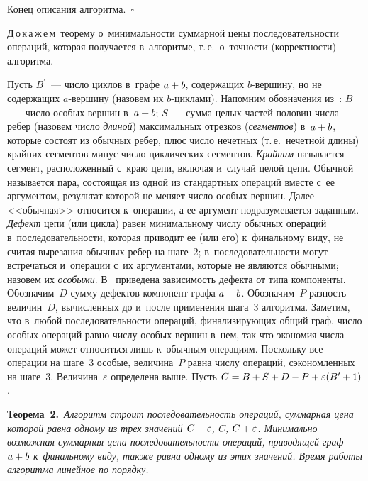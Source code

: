 \begin{multicols}{2}
  Конец описания алгоритма.~$\square$
  \smallskip
  
  Д\,о\,к\,а\,ж\,е\,м\ теорему о~минимальности суммарной цены 
последовательности операций, которая получается в~алгоритме, т.\,е.\ 
о~точ\-ности (корректности) алгоритма. 
  
  Пусть $B^\prime$~--- число циклов в~графе $a\hm+b$, содержащих  
$b$-вер\-ши\-ну, но не содержащих $a$-вер\-ши\-ну (назовем их  
$b$-цик\-ла\-ми). Напомним обозначения из~\cite{2-gor}: $B$~--- число особых 
вершин в~$a\hm+b$; $S$~--- сумма целых частей половин числа ребер (назовем 
число \textit{длиной}) максимальных отрезков (\textit{сегментов}) в~$a\hm+b$, 
которые состоят из обычных ребер, плюс число нечетных (т.\,е.\ нечетной 
длины) крайних сегментов минус число циклических сегментов. 
\textit{Крайним} называется сегмент, расположенный с~краю цепи, включая 
и~случай целой цепи. Обычной называется пара, состоящая из одной из 
стандартных операций вместе с~ее аргументом, результат которой не меняет 
число особых вершин. Далее <<обычная>> относится к~операции, а ее аргумент 
подразумевается заданным. \textit{Дефект} цепи (или цикла) равен 
минимальному числу обычных операций в~последовательности, которая 
приводит ее (или его) к~финальному виду, не считая вырезания обычных ребер 
на шаге~2; в~последовательности могут встречаться и~операции с~их 
аргументами, которые не являются обычными; назовем их \textit{особыми}. 
В~\cite{2-gor} приведена зависимость дефекта от типа компоненты. 
Обозначим~$D$ сумму дефектов компонент графа $a\hm+b$. Обозначим~$P$ 
разность величин~$D$, вычисленных до и~после применения шага~3 
алгоритма. Заметим, что в~любой последовательности операций, 
финализирующих общий граф, число особых операций равно числу особых 
вершин в~нем, так что экономия числа операций может относиться лишь 
к~обычным операциям. Поскольку все операции на шаге~3 особые, 
величина~$P$ равна числу операций, сэкономленных на шаге~3. 
Величина~$\varepsilon$ определена выше. Пусть $C\hm=B\hm+S\hm+D\hm- 
P \hm+\varepsilon(B^\prime\hm+1)$. 
  
  \smallskip
  
  \noindent
  \textbf{Теорема~2.}\ \textit{Алгоритм строит последовательность 
операций, суммарная цена которой равна одному из трех значений $C\hm-
\varepsilon$, $C$, $C\hm+\varepsilon$. Минимально возможная суммарная цена 
последовательности операций, приводящей граф $a\hm+b$ к~финальному виду, 
также равна одному из этих значений. Время работы алгоритма линейное по 
порядку.}
  \smallskip
  

\end{multicols}
